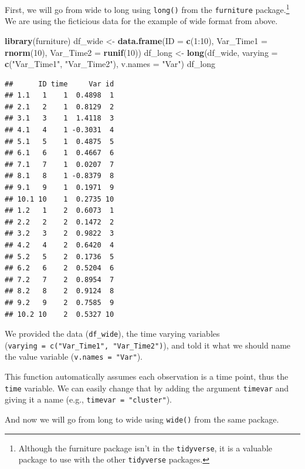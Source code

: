 \documentclass[]{tufte-book}
\newenvironment{Shaded}{}{}
\newcommand{\KeywordTok}[1]{\textcolor[rgb]{0.00,0.44,0.13}{\textbf{#1}}}
\newcommand{\DataTypeTok}[1]{\textcolor[rgb]{0.56,0.13,0.00}{#1}}
\newcommand{\DecValTok}[1]{\textcolor[rgb]{0.25,0.63,0.44}{#1}}
\newcommand{\StringTok}[1]{\textcolor[rgb]{0.25,0.44,0.63}{#1}}
\newcommand{\OperatorTok}[1]{\textcolor[rgb]{0.40,0.40,0.40}{#1}}
\newcommand{\NormalTok}[1]{#1}
\theoremstyle{definition}
\theoremstyle{definition}
\theoremstyle{remark}
\begin{document}
First, we will go from wide to long using \texttt{long()} from the
\texttt{furniture} package.\footnote{Although the furniture package
  isn't in the \texttt{tidyverse}, it is a valuable package to use with
  the other \texttt{tidyverse} packages.} We are using the ficticious
data for the example of wide format from above.

\begin{Shaded}
\begin{Highlighting}[]
\KeywordTok{library}\NormalTok{(furniture)}
\NormalTok{df_wide <-}\StringTok{ }\KeywordTok{data.frame}\NormalTok{(}\DataTypeTok{ID =} \KeywordTok{c}\NormalTok{(}\DecValTok{1}\OperatorTok{:}\DecValTok{10}\NormalTok{), }\DataTypeTok{Var_Time1 =} \KeywordTok{rnorm}\NormalTok{(}\DecValTok{10}\NormalTok{), }
    \DataTypeTok{Var_Time2 =} \KeywordTok{runif}\NormalTok{(}\DecValTok{10}\NormalTok{))}
\NormalTok{df_long <-}\StringTok{ }\KeywordTok{long}\NormalTok{(df_wide, }\DataTypeTok{varying =} \KeywordTok{c}\NormalTok{(}\StringTok{"Var_Time1"}\NormalTok{, }
    \StringTok{"Var_Time2"}\NormalTok{), }\DataTypeTok{v.names =} \StringTok{"Var"}\NormalTok{)}
\NormalTok{df_long}
\end{Highlighting}
\end{Shaded}

\begin{verbatim}
##      ID time     Var id
## 1.1   1    1  0.4898  1
## 2.1   2    1  0.8129  2
## 3.1   3    1  1.4118  3
## 4.1   4    1 -0.3031  4
## 5.1   5    1  0.4875  5
## 6.1   6    1  0.4667  6
## 7.1   7    1  0.0207  7
## 8.1   8    1 -0.8379  8
## 9.1   9    1  0.1971  9
## 10.1 10    1  0.2735 10
## 1.2   1    2  0.6073  1
## 2.2   2    2  0.1472  2
## 3.2   3    2  0.9822  3
## 4.2   4    2  0.6420  4
## 5.2   5    2  0.1736  5
## 6.2   6    2  0.5204  6
## 7.2   7    2  0.8954  7
## 8.2   8    2  0.9124  8
## 9.2   9    2  0.7585  9
## 10.2 10    2  0.5327 10
\end{verbatim}

We provided the data (\texttt{df\_wide}), the time varying variables
(\texttt{varying\ =\ c("Var\_Time1",\ "Var\_Time2")}), and told it what
we should name the value variable (\texttt{v.names\ =\ "Var"}).

This function automatically assumes each observation is a time point,
thus the \texttt{time} variable. We can easily change that by adding the
argument \texttt{timevar} and giving it a name (e.g.,
\texttt{timevar\ =\ "cluster"}).

And now we will go from long to wide using \texttt{wide()} from the same
package.
\end{document}
